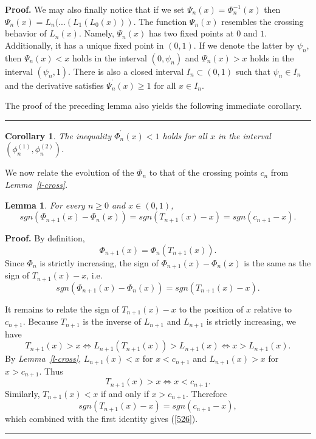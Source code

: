 \documentclass[onecolumn]{article}
\newtheorem{corollary}[theorem]{Corollary}
\newtheorem{lemma}[theorem]{Lemma}
\newenvironment{proof}[1][Proof]{\noindent\textbf{#1.} }{\ \rule{0.5em}{0.5em}}
\begin{document}
\begin{proof}
We may also finally notice that if we set $\Psi _{n}(x)=\Phi _{n}^{-1}(x)$
then $\Psi _{n}(x)=L_{n}(...(L_{1}(L_{0}(x)))$. The function $\Psi _{n}(x)$
resembles the crossing behavior of $L_{n}(x)$. Namely, $\Psi _{n}(x)$ has
two fixed points at $0$ and $1$. Additionally, it has a unique fixed point
in $(0,1)$. If we denote the latter by $\psi _{n}$, then $\Psi _{n}(x)<x$
holds in the interval $(0,\psi _{n})$ and $\Psi _{n}(x)>x$ holds in the
interval $(\psi _{n},1)$. There is also a closed interval $I_{n}\subset
(0,1) $ such that $\psi _{n}\in I_{n}$ and the derivative satisfies $\Psi
_{n}^{^{\prime }}(x)\geq 1$ for all $x\in I_{n}$.

The proof of the preceding lemma also yields the following immediate
corollary.
\end{proof}

\begin{corollary}
\label{Phi-c} The inequality $\Phi _{n}^{^{\prime }}(x)<1$ holds for all $x$
in the interval $(\phi _{n}^{(1)},\phi _{n}^{(2)})$.
\end{corollary}

We now relate the evolution of the $\Phi _{n}$ to that of the crossing
points $c_{n}$ from \textit{Lemma~\ref{l-cross}}.

\begin{lemma}
\label{dir} For every $n\geq 0$ and $x\in (0,1)$, 
\begin{equation}
sgn(\Phi _{n+1}(x)-\Phi _{n}(x))=sgn(T_{n+1}(x)-x)=sgn(c_{n+1}-x).
\label{526}
\end{equation}
\end{lemma}

\begin{proof}
\noindent By definition, 
\begin{equation}
\Phi _{n+1}(x)=\Phi _{n}(T_{n+1}(x)).  \label{526.1}
\end{equation}%
Since $\Phi _{n}$ is strictly increasing, the sign of $\Phi _{n+1}(x)-\Phi
_{n}(x)$ is the same as the sign of $T_{n+1}(x)-x$, i.e. 
\begin{equation}
sgn(\Phi _{n+1}(x)-\Phi _{n}(x))=sgn(T_{n+1}(x)-x).  \label{526.2}
\end{equation}

It remains to relate the sign of $T_{n+1}(x)-x$ to the position of $x$
relative to $c_{n+1}$. Because $T_{n+1}$ is the inverse of $L_{n+1}$ and $%
L_{n+1}$ is strictly increasing, we have 
\begin{equation}
T_{n+1}(x)>x\iff L_{n+1}(T_{n+1}(x))>L_{n+1}(x)\iff x>L_{n+1}(x).
\label{528}
\end{equation}%
By \textit{Lemma~\ref{l-cross}}, $L_{n+1}(x)<x$ for $x<c_{n+1}$ and $%
L_{n+1}(x)>x$ for $x>c_{n+1}$. Thus 
\begin{equation}
T_{n+1}(x)>x\iff x<c_{n+1}.  \label{529}
\end{equation}%
Similarly, $T_{n+1}(x)<x$ if and only if $x>c_{n+1}$. Therefore 
\begin{equation}
sgn(T_{n+1}(x)-x)=sgn(c_{n+1}-x),  \label{530}
\end{equation}%
which combined with the first identity gives (\ref{526}).
\end{proof}
\end{document}
